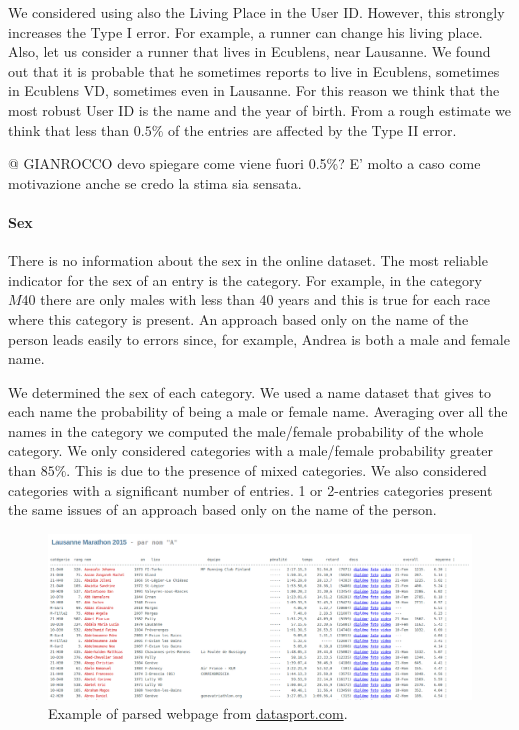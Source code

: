 \documentclass[fleqn,10pt]{wlscirep}
\begin{document}
        We considered using also the Living Place in the User ID. However, this strongly increases
        the Type I error. For example, a runner can change his living place. Also, let us consider
        a runner that lives in Ecublens, near Lausanne. We found out that it is probable that he sometimes
        reports to live in Ecublens, sometimes in Ecublens VD, sometimes even in Lausanne.
        For this reason we think that the most robust User ID is the name and the year of birth.
        From a rough estimate we think that less than $0.5\%$ of the entries are affected by the Type II error.

        @ GIANROCCO devo spiegare come viene fuori 0.5\%? E' molto a caso come motivazione anche se credo la
        stima sia sensata.

        \paragraph{Sex} There is no information about the sex in the online dataset.
        The most reliable indicator for the sex of an entry is the category. For example, in 
        the category $M40$ there are only males with less than 40 years and this is true for
        each race where this category is present.
        An approach based only on the name of the person leads easily to errors since, for example,
        Andrea is both a male and female name.

        We determined the sex of each category. We used a name dataset that gives to
        each name the probability of being a male or female name.
        Averaging over all the names in the category we computed the male/female
        probability of the whole category. We only considered categories with a 
        male/female probability greater than $85\%$. This is due to the presence
        of mixed categories.
        We also considered categories with a significant number of entries. 1 or 2-entries categories
        present the same issues of an approach based only on the name of the person.

\begin{figure}[h!]
    \centering
    \includegraphics[scale=0.32]{Figures/exampleParsing.png}
    \caption{Example of parsed webpage from \url{datasport.com}.}
    \label{fig:exParsing}
\end{figure}
\end{document}
